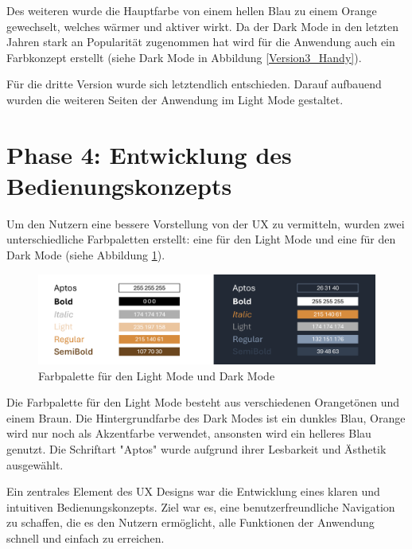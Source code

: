 Des weiteren wurde die Hauptfarbe von einem hellen Blau zu einem Orange gewechselt, welches wärmer und aktiver wirkt. Da der Dark Mode in den letzten Jahren stark an Popularität zugenommen hat \cite{diva2020darkmode} wird für die Anwendung auch ein Farbkonzept erstellt (siehe Dark Mode in Abbildung \ref{Version3_Handy}). 

Für die dritte Version wurde sich letztendlich entschieden. Darauf aufbauend wurden die weiteren Seiten der Anwendung im Light Mode gestaltet.

\section{Phase 4: Entwicklung des Bedienungskonzepts}
\label{sec:bedienungskonzept}
Um den Nutzern eine bessere Vorstellung von der UX zu vermitteln, wurden zwei unterschiedliche Farbpaletten erstellt: eine für den Light Mode und eine für den Dark Mode (siehe Abbildung \ref{Farbpalette}).

\begin{figure}[h]
    \centering
    \includegraphics[clip,width=0.9\linewidth]{images/Farbpalette.png}
    \caption[Farbpalette für den Light Mode und Dark Mode]{Farbpalette für den Light Mode und Dark Mode}
    \label{Farbpalette}
\end{figure}

Die Farbpalette für den Light Mode besteht aus verschiedenen Orangetönen und einem Braun. Die Hintergrundfarbe des Dark Modes ist ein dunkles Blau, Orange wird nur noch als Akzentfarbe verwendet, ansonsten wird ein helleres Blau genutzt.
Die Schriftart "Aptos" wurde aufgrund ihrer Lesbarkeit und Ästhetik ausgewählt.

Ein zentrales Element des UX Designs war die Entwicklung eines klaren und intuitiven Bedienungskonzepts. Ziel war es, eine benutzerfreundliche Navigation zu schaffen, die es den Nutzern ermöglicht, alle Funktionen der Anwendung schnell und einfach zu erreichen.

